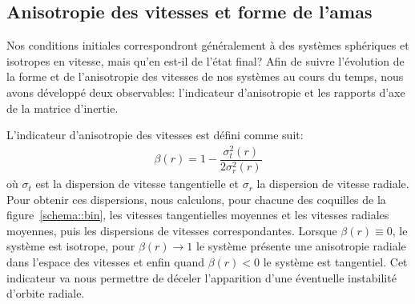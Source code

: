 


		\subsection{Anisotropie des vitesses et forme de l'amas}

			Nos conditions initiales correspondront généralement à des systèmes sphériques et isotropes en vitesse, mais
			qu'en est-il de l'état final?
			Afin de suivre l'évolution de la forme et de l'anisotropie des vitesses de nos systèmes au cours
			du temps, nous avons développé deux observables:
			l'indicateur d'anisotropie et les rapports d'axe de la matrice d'inertie.

			L'indicateur d'anisotropie des vitesses est défini comme suit:
			\begin{align}
				\beta(r) = 1 - \dfrac{\sigma_t^2(r)}{2\sigma_r^2(r)}
			\end{align}
			où $\sigma_t$ est la dispersion de vitesse tangentielle et $\sigma_r$ la dispersion de vitesse
			radiale. Pour obtenir ces dispersions, nous calculons, pour chacune des coquilles de la
			figure~\ref{schema::bin}, les vitesses tangentielles moyennes et les vitesses radiales moyennes,
			puis les dispersions de vitesses correspondantes.
			Lorsque $\beta(r) \equiv 0$, le système est isotrope, pour $\beta(r) \to 1$ le système présente une anisotropie radiale dans
			l'espace des vitesses et enfin quand $\beta(r) < 0$ le système est tangentiel.
			Cet indicateur va nous permettre de déceler l'apparition d'une éventuelle instabilité
			d'orbite radiale.

